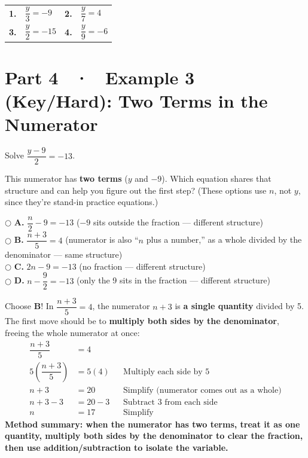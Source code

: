 \documentclass[11pt]{article}
\newcommand{\choice}[2]{\hspace{2mm}$\bigcirc$\; \textbf{#1.} #2}
\begin{document}
\begin{tabularx}{\linewidth}{@{}p{0.5cm} X p{0.5cm} X@{}}
\textbf{1.} & $\dfrac{y}{3} = -9$ & \textbf{2.} & $\dfrac{y}{7} = 4$ \\[10mm]
\textbf{3.} & $\dfrac{y}{2} = -15$ & \textbf{4.} & $\dfrac{y}{9} = -6$ \\[10mm]
\end{tabularx}

\newpage
\section*{Part 4 \ · \ Example 3 (Key/Hard): Two Terms in the Numerator}

\begin{targetbox}
Solve \; $\dfrac{y-9}{2} = -13$.
\end{targetbox}

\begin{choosebox}
This numerator has \textbf{two terms} ($y$ and $-9$). Which equation shares that structure and can help you figure out the first step? (These options use $n$, not $y$, since they're stand-in practice equations.)

\choice{A}{$\dfrac{n}{2} - 9 = -13$ \quad ($-9$ sits outside the fraction --- different structure)}\\[1mm]
\choice{B}{$\dfrac{n+3}{5} = 4$ \quad (numerator is also ``$n$ plus a number,'' as a whole divided by the denominator --- same structure)}\\[1mm]
\choice{C}{$2n - 9 = -13$ \quad (no fraction --- different structure)}\\[1mm]
\choice{D}{$n - \dfrac{9}{2} = -13$ \quad (only the 9 sits in the fraction --- different structure)}
\end{choosebox}

\begin{helperbox}
Choose \textbf{B}! In $\dfrac{n+3}{5}=4$, the numerator $n+3$ is \textbf{a single quantity} divided by 5. The first move should be to \textbf{multiply both sides by the denominator}, freeing the whole numerator at once:
\begin{align*}
\dfrac{n+3}{5} &= 4\\
5\left(\dfrac{n+3}{5}\right) &= 5(4) &&\text{Multiply each side by 5}\\
n + 3 &= 20 &&\text{Simplify (numerator comes out as a whole)}\\
n + 3 - 3 &= 20 - 3 &&\text{Subtract 3 from each side}\\
n &= 17 &&\text{Simplify}
\end{align*}
\textbf{Method summary: when the numerator has two terms, treat it as one quantity, multiply both sides by the denominator to clear the fraction, then use addition/subtraction to isolate the variable.}
\end{helperbox}
\end{document}
